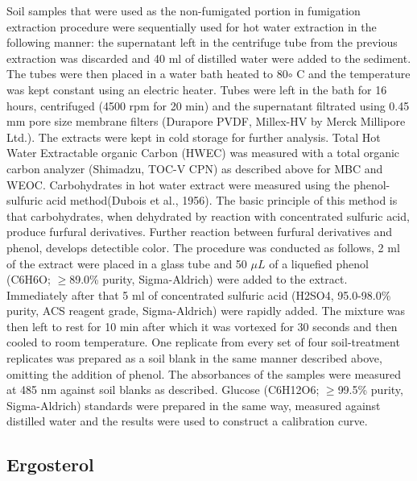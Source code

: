 \documentclass[12pt]{report}
\begin{document}
Soil samples that were used as the non-fumigated portion in fumigation extraction procedure were sequentially used for hot water extraction in the following manner: the supernatant left in the centrifuge tube from the previous extraction was discarded and 40 ml of distilled water were added to the sediment. The tubes were then placed in a water bath heated to 80$\circ$ C and the temperature was kept constant using an electric heater. Tubes were left in the bath for 16 hours, centrifuged (4500 rpm for 20 min) and the supernatant filtrated using 0.45 mm pore size membrane filters (Durapore PVDF, Millex-HV by Merck Millipore Ltd.). The extracts were kept in cold storage for further analysis.
Total Hot Water Extractable organic Carbon (HWEC) was measured with a  total organic carbon analyzer (Shimadzu, TOC-V CPN) as described above for MBC and WEOC.
Carbohydrates in hot water extract were measured using the phenol-sulfuric acid method(Dubois et al., 1956). The basic principle of this method is that carbohydrates, when dehydrated by reaction with concentrated sulfuric acid, produce furfural derivatives. Further reaction between furfural derivatives and phenol, develops detectible color. The procedure was conducted as follows, 2 ml of the extract were placed in a glass tube and 50 $ \mu L $ of a liquefied phenol (C6H6O; $ \geq $89.0\% purity, Sigma-Aldrich) were added to the extract. Immediately after that 5 ml of concentrated sulfuric acid (H2SO4, 95.0-98.0\% purity, ACS reagent grade, Sigma-Aldrich) were rapidly added. The mixture was then left to rest for 10 min after which it was vortexed for 30 seconds and then cooled to room temperature. One replicate from every set of four soil-treatment replicates was prepared as a soil blank in the same manner described above, omitting the addition of phenol. The absorbances of the samples were measured at 485 nm against soil blanks as described. Glucose (C6H12O6; $ \geq $99.5\% purity, Sigma-Aldrich) standards were prepared in the same way, measured against distilled water and the results were used to construct a calibration curve. 


\subsection{Ergosterol}
\end{document}
